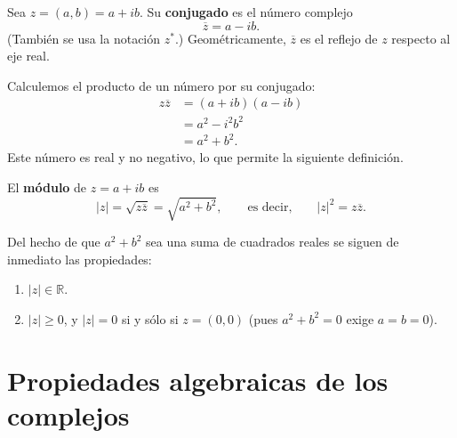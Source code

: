 \documentclass[12pt,a4paper]{book}
\begin{document}
  \begin{definicion}[Conjugado]
    Sea $z=(a,b)=a+ib$. Su \textbf{conjugado} es el número complejo
    \begin{equation*}
      \overline{z}=a-ib.
    \end{equation*}
    (También se usa la notación $z^*$.) Geométricamente, $\overline{z}$ es el reflejo de $z$ respecto al eje real.
  \end{definicion}

  Calculemos el producto de un número por su conjugado:
  \begin{align*}
    z\overline{z} & = (a+ib)(a-ib)  \\
                  & = a^2-i^2b^2    \\
                  & = a^2+b^2.
  \end{align*}
  Este número es real y no negativo, lo que permite la siguiente definición.

  \begin{definicion}[Módulo]
    El \textbf{módulo} de $z=a+ib$ es
    \begin{equation*}
      |z|=\sqrt{z\overline{z}}=\sqrt{a^2+b^2}, \qquad\text{es decir,}\qquad |z|^2=z\overline{z}.
    \end{equation*}
  \end{definicion}

  Del hecho de que $a^2+b^2$ sea una suma de cuadrados reales se siguen de inmediato las propiedades:
  \begin{enumerate}[label=\roman*)]
    \item $|z|\in\mathbb{R}$.
    \item $|z|\geq 0$, y $|z|=0$ si y sólo si $z=(0,0)$ (pues $a^2+b^2=0$ exige $a=b=0$).
  \end{enumerate}

  \section{Propiedades algebraicas de los complejos}
\end{document}
